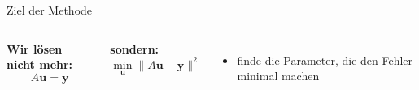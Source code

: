 \begin{frame}{Ziel der Methode}

\begin{columns}


\textbf{Wir lösen nicht mehr:}
\[
A \mathbf{u} = \mathbf{y}
\]

\textbf{sondern:}
\[
\boxed{
\min_{\mathbf{u}} \|A\mathbf{u} - \mathbf{y}\|^2
}
\]

\begin{itemize}
\item  {} finde die Parameter, die den Fehler minimal machen
\end{itemize}




\medskip


\end{columns}

\end{frame}

